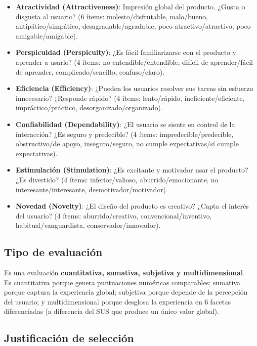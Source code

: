 \documentclass[a4paper,12pt]{report}
\begin{document}
\begin{itemize}
    \item \textbf{Atractividad (Attractiveness)}: Impresión global del producto. ¿Gusta o disgusta al usuario? (6 ítems: molesto/disfrutable, malo/bueno, antipático/simpático, desagradable/agradable, poco atractivo/atractivo, poco amigable/amigable).
    \item \textbf{Perspicuidad (Perspicuity)}: ¿Es fácil familiarizarse con el producto y aprender a usarlo? (4 ítems: no entendible/entendible, difícil de aprender/fácil de aprender, complicado/sencillo, confuso/claro).
    \item \textbf{Eficiencia (Efficiency)}: ¿Pueden los usuarios resolver sus tareas sin esfuerzo innecesario? ¿Responde rápido? (4 ítems: lento/rápido, ineficiente/eficiente, impráctico/práctico, desorganizado/organizado).
    \item \textbf{Confiabilidad (Dependability)}: ¿El usuario se siente en control de la interacción? ¿Es seguro y predecible? (4 ítems: impredecible/predecible, obstructivo/de apoyo, inseguro/seguro, no cumple expectativas/sí cumple expectativas).
    \item \textbf{Estimulación (Stimulation)}: ¿Es excitante y motivador usar el producto? ¿Es divertido? (4 ítems: inferior/valioso, aburrido/emocionante, no interesante/interesante, desmotivador/motivador).
    \item \textbf{Novedad (Novelty)}: ¿El diseño del producto es creativo? ¿Capta el interés del usuario? (4 ítems: aburrido/creativo, convencional/inventivo, habitual/vanguardista, conservador/innovador).
\end{itemize}

\subsection{Tipo de evaluación}

Es una evaluación \textbf{cuantitativa, sumativa, subjetiva y multidimensional}. Es cuantitativa porque genera puntuaciones numéricas comparables; sumativa porque captura la experiencia global; subjetiva porque depende de la percepción del usuario; y multidimensional porque desglosa la experiencia en 6 facetas diferenciadas (a diferencia del SUS que produce un único valor global).

\subsection{Justificación de selección}
\end{document}
